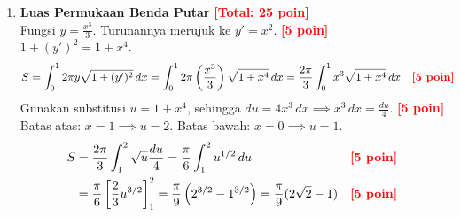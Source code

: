 \documentclass[a4paper,12pt]{article}
\begin{document}
\begin{enumerate}
        \textbf{Ilustrasi:}
        \begin{center}
        \end{center}

  \item \textbf{Luas Permukaan Benda Putar} \hfill \textcolor{red}{\textbf{[Total: 25 poin]}} \\
        Fungsi $y = \frac{x^3}{3}$. Turunannya merujuk ke $y' = x^2$. \hfill \textcolor{red}{\textbf{[5 poin]}} \\
        $1 + (y')^2 = 1 + x^4$.
        \begin{align*}
          S & = \int_0^1 2\pi y \sqrt{1 + (y')^2} \,dx = \int_0^1 2\pi \left( \frac{x^3}{3} \right) \sqrt{1 + x^4} \,dx = \frac{2\pi}{3} \int_0^1 x^3 \sqrt{1 + x^4} \,dx &  & \text{\textcolor{red}{\textbf{[5 poin]}}}
        \end{align*}
        Gunakan substitusi $u = 1 + x^4$, sehingga $du = 4x^3 \,dx \implies x^3 \,dx = \frac{du}{4}$. \hfill \textcolor{red}{\textbf{[5 poin]}} \\
        Batas atas: $x = 1 \implies u = 2$. Batas bawah: $x = 0 \implies u = 1$.
        \begin{align*}
          S & = \frac{2\pi}{3} \int_1^2 \sqrt{u} \frac{du}{4} = \frac{\pi}{6} \int_1^2 u^{1/2} \,du                                                   &  & \text{\textcolor{red}{\textbf{[5 poin]}}} \\
            & = \frac{\pi}{6} \left[ \frac{2}{3} u^{3/2} \right]_1^2 = \frac{\pi}{9} \left( 2^{3/2} - 1^{3/2} \right) = \frac{\pi}{9} (2\sqrt{2} - 1) &  & \text{\textcolor{red}{\textbf{[5 poin]}}}
        \end{align*}


\end{enumerate}
\end{document}
